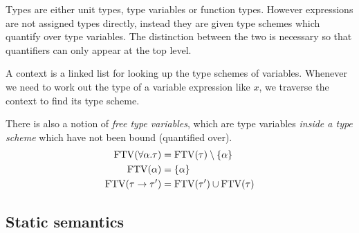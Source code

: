 Types are either unit types, type variables or function types. However
expressions are not assigned types directly, instead they are given
type schemes which quantify over type variables. The distinction
between the two is necessary so that quantifiers can only
appear at the top level. 

A context is a linked list for looking up the type schemes of
variables. Whenever we need to work out the type of a variable
expression like $x$, we traverse the context to find its type scheme.

There is also a notion of \emph{free type variables}, which are type
variables \emph{inside a type scheme} which have not been bound
(quantified over).
\begin{align*}
  \operatorname{FTV}(\forall \alpha . \tau) &= \operatorname{FTV}(\tau) \setminus \{\alpha\} \\
  \operatorname{FTV}(\alpha) &= \{ \alpha \} \\
  \operatorname{FTV}(\tau \rightarrow \tau') &= \operatorname{FTV}(\tau') \cup \operatorname{FTV}(\tau)
\end{align*}

\subsection{Static semantics}

